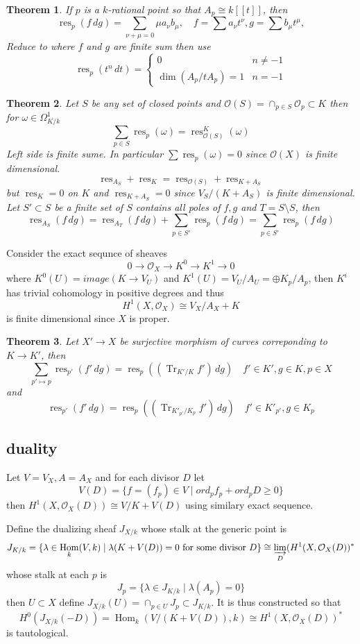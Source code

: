\documentclass[leqno]{amsart}
\DeclareMathOperator{\Tr}{Tr}
\newcommand{\oo}{\mathcal O}
\newcommand{\1}{\mathbf{1}}
\DeclareMathOperator{\Hom}{Hom}
\DeclareMathOperator{\res}{res}
\newtheorem{thm}{Theorem}[section]
\theoremstyle{definition}
\theoremstyle{remark}
\begin{document}
\begin{thm}
	If $p$ is a $k$-rational point 
	so that $A_p\cong k[[t]]$, 
	then
	\[
		\res_p(f\,dg)=
		\sum_{\nu+\mu=0}\mu a_\nu b_\mu,\quad
		f=\sum a_\nu t^\nu,
		g=\sum b_\mu t^\mu,
	\]
	Reduce to where $f$ and $g$ are finite sum
	then  use
	\[
		\res_p(t^n \,dt)=
		\begin{cases}
			0 & n\neq -1\\
			\dim(A_p/tA_p)=1 & n=-1
		\end{cases}
	\]
\end{thm}

\begin{thm}
	Let $S$ be any set of closed points 
	and  $\oo(S)=\cap_{p\in S}\oo_p\subset K$
	then for $\omega\in \Omega^1_{K/k}$
	\[
		\sum_{p\in S}\res_p(\omega)=
		\res_{\oo(S)}^K(\omega)
	\]
	Left side is finite sume.
	In particular $\sum\res_p(\omega)=0$
	since $\oo(X)$ is finite dimensional.
	\[
		\res_{A_S}+\res_K=\res_{\oo(S)}+\res_{K+A_S}
	\]
	but $\res_K=0$ on  $K$
	and  $\res_{K+A_S}=0$
	since $V_S/(K+A_S)$ is finite dimensional.
	Let $S'\subset S$ be a finite set of  $S$
	contains all poles of  $f,g$
	and  $T=S\setminus S$, then
	 \[
		 \res_{A_S}(f\,dg)=
		 \res_{A_T}(f\,dg)+
		 \sum_{p\in S'}\res_{p}(f\,dg)=
		 \sum_{p\in S'}\res_{p}(f\,dg)
	\]
\end{thm}
Consider the exact sequnce of sheaves
\[
	0\to \oo_X\to K^0\to K^1\to 0
\]
where $K^0(U)=image(K\to V_U)$
and  $K^1(U)=V_U/A_U=\oplus K_p/A_p$,
then  $K^i$ has trivial cohomology in positive degrees
and thus
\[
	H^1(X,\oo_X)\cong V_X/A_X+K
\]
is finite dimensional since $X$ is proper.

\begin{thm}
	Let $X'\to X$
	be surjective morphism of curves
	correponding to  $K\to K'$, then
	\[
		\sum_{p'\mapsto p}
		\res_{p'}(f'\,dg)=\res_p((\Tr_{K'/K}f')\,dg)
		\quad
		f'\in K', g\in K, p\in X
	\]
	and 
	\[
		\res_{p'}(f'\,dg)=\res_p((\Tr_{K'_{p'}/K_p}f')\,dg)
		\quad
		f'\in K'_{p'}, g\in K_p
	\]
\end{thm}

\subsection{duality}
Let $V=V_X, A=A_X$ and for each divisor  $D$ let
 \[
	 V(D)=\{f=(f_p)\in V\mid ord_pf_p+ ord_pD\geq 0\}
\]
then $H^1(X,\oo_X(D))\cong V/K+V(D)$
using similary exact sequence.

Define the dualizing sheaf $J_{X/k}$
whose stalk at the generic point is
\[
	J_{K/k}=
	\{\lambda\in \Hom_k(V,k)\mid
	\lambda(K+V(D))=0 \text{ for some divisor }D\}
	\cong \varinjlim_D (H^1(X,\oo_X(D))^*
\]
whose stalk at each $p$ is 
 \[
	 J_p=\{\lambda\in J_{K/k}\mid \lambda(A_p)=0\}
 \]
then $U\subset X$
define  $J_{X/k}(U)=\cap_{p\in U}J_p\subset J_{K/k}$.
It is thus constructed so that
\[
	H^0(J_{X/k}(-D))=\Hom_k(V/(K+V(D)),k)\cong 
	H^1(X,\oo_X(D))^*
\]
is tautological.
\end{document}
